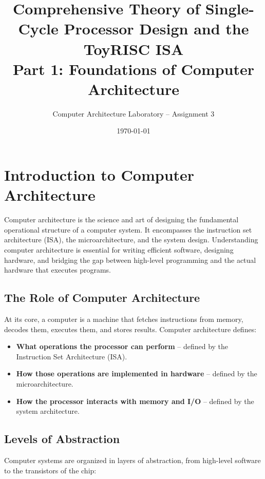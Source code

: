 \documentclass[12pt,a4paper]{article}
\title{\Huge\bfseries Comprehensive Theory of Single-Cycle Processor Design and the ToyRISC ISA\\[1em]
\Large Part 1: Foundations of Computer Architecture}
\author{Computer Architecture Laboratory -- Assignment 3}
\date{\today}
\begin{document}
\maketitle
\tableofcontents
\newpage

\section{Introduction to Computer Architecture}

Computer architecture is the science and art of designing the fundamental operational structure of a computer system. It encompasses the instruction set architecture (ISA), the microarchitecture, and the system design. Understanding computer architecture is essential for writing efficient software, designing hardware, and bridging the gap between high-level programming and the actual hardware that executes programs.

\subsection{The Role of Computer Architecture}

At its core, a computer is a machine that fetches instructions from memory, decodes them, executes them, and stores results. Computer architecture defines:

\begin{itemize}[leftmargin=*]
    \item \textbf{What operations the processor can perform} -- defined by the Instruction Set Architecture (ISA).
    \item \textbf{How those operations are implemented in hardware} -- defined by the microarchitecture.
    \item \textbf{How the processor interacts with memory and I/O} -- defined by the system architecture.
\end{itemize}

\subsection{Levels of Abstraction}

Computer systems are organized in layers of abstraction, from high-level software to the transistors of the chip:
\end{document}
